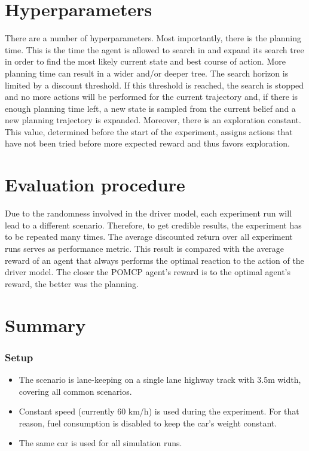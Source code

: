 \section*{Hyperparameters}

There are a number of hyperparameters. Most importantly, there is the planning time. This is the time the agent is allowed to search in and expand its search tree in order to find the most likely current state and best course of action. More planning time can result in a wider and/or deeper tree. The search horizon is limited by a discount threshold. If this threshold is reached, the search is stopped and no more actions will be performed for the current trajectory and, if there is enough planning time left, a new state is sampled from the current belief and a new planning trajectory is expanded. Moreover, there is an exploration constant. This value, determined before the start of the experiment, assigns actions that have not been tried before more expected reward and thus favors exploration.

\section*{Evaluation procedure}

Due to the randomness involved in the driver model, each experiment run will lead to a different scenario. Therefore, to get credible results, the experiment has to be repeated many times. The average discounted return over all experiment runs serves as performance metric. This result is compared with the average reward of an agent that always performs the optimal reaction to the action of the driver model. The closer the POMCP agent's reward is to the optimal agent's reward, the better was the planning.

\section*{Summary}

\subsubsection*{Setup}
\begin{itemize}
    \item The scenario is lane-keeping on a single lane highway track with 3.5m width, covering all common scenarios.
    \item Constant speed (currently 60 km/h) is used during the experiment. For that reason, fuel consumption is disabled to keep the car's weight constant.
    \item The same car is used for all simulation runs.
\end{itemize}

